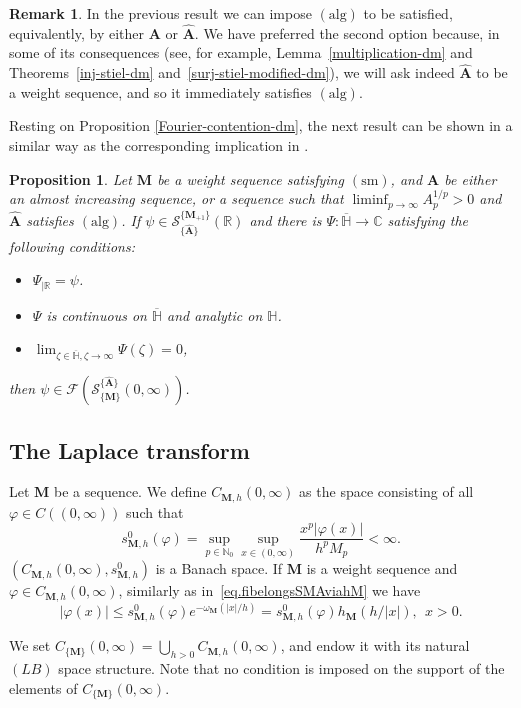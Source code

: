 \documentclass[12pt,a4paper]{article}
\newcommand{\N}{\mathbb{N}}
\newcommand{\R}{\mathbb{R}}
\newcommand{\C}{\mathbb{C}}
\newcommand{\HH}{\mathbb{H}}
\newcommand{\CM}{C_{\{\M\}}(0,\infty)}
\newcommand{\M}{{\boldsymbol{M}}}
\newcommand{\A}{{\boldsymbol{A}}}
\newcommand{\hA}{\widehat{{\boldsymbol{A}}}}
\newcommand{\alg}{\operatorname{(alg)}}
\newcommand{\sm}{\operatorname{(sm)}}
\newcommand{\om}{\omega}
\theoremstyle{plain}
\newtheorem{proposition}[theorem]{Proposition}
\theoremstyle{definition}
\newtheorem{remark}[theorem]{Remark}
\numberwithin{equation}{section}
\begin{document}
\begin{remark}
In the previous result we can impose $\alg$ to be satisfied, equivalently, by either $\A$ or $\hA$. We have preferred the second option because, in some of its consequences (see, for example, Lemma~\ref{multiplication-dm} and Theorems~\ref{inj-stiel-dm} and~\ref{surj-stiel-modified-dm}), we will ask indeed $\hA$ to be a weight sequence, and so it immediately satisfies $\alg$.
\end{remark}

Resting on Proposition \ref{Fourier-contention-dm}, the next result can be shown in a similar way as the corresponding implication in \cite[Prop.\ 2.1]{C-C-K}.
\begin{proposition}\label{Fourier-image-dm} Let $\M$ be a weight sequence satisfying $\sm$, and $\A$ be either an almost increasing sequence, or a sequence such that $\liminf_{p\to\infty}A_p^{1/p}>0$ and $\hA$ satisfies $\alg$. If $\psi \in \mathcal{S}^{\{\M_{+1}\}}_{\{\hA\}}(\R)$ and there is $\Psi: \overline{\HH} \rightarrow \C$ satisfying the following conditions:
\begin{itemize}
\item[$(i)$] $\Psi_{|\R} = \psi$.
\item[$(ii)$] $\Psi$ is continuous on $\overline{\HH}$ and analytic on $\HH$.
\item[$(iii)$] $\lim_{\zeta \in \overline{\HH}, \zeta \to \infty} \Psi(\zeta) = 0$,
\end{itemize}
then $\psi \in \mathcal{F}(\mathcal{S}^{\{\hA\}}_{\{\M\}}(0,\infty))$.
\end{proposition}

\subsection{The Laplace transform}\label{sect-Laplace-dm} Let $\M$ be a sequence. We define $C_{\M,h}(0,\infty)$ as the space consisting of all $\varphi \in C((0,\infty))$ such that
$$
s_{\M,h}^0(\varphi)=\sup_{p \in \N_0} \sup_{x \in (0,\infty)} \frac{x^p|\varphi(x)|}{h^{p}M_p} < \infty.
$$
$(C_{\M,h}(0,\infty),s_{\M,h}^0)$ is a Banach space.
If $\M$ is a weight sequence and $\varphi\in C_{\M,h}(0,\infty)$,
similarly as in~\eqref{eq.fibelongsSMAviahM} we have
\begin{equation}\label{eq.fibelongsCMviahM}
|\varphi(x)|\le s_{\M,h}^0(\varphi)e^{-\om_{\M}(|x|/h)}= s_{\M,h}^0(\varphi)h_{\M}(h/|x|),\ \ x>0.
\end{equation}

We set $\CM = \bigcup_{h>0} C_{\M,h}(0,\infty)$, and endow it with its natural $(LB)$ space structure. Note that no condition is imposed on the support of the elements of $\CM$.
\end{document}
